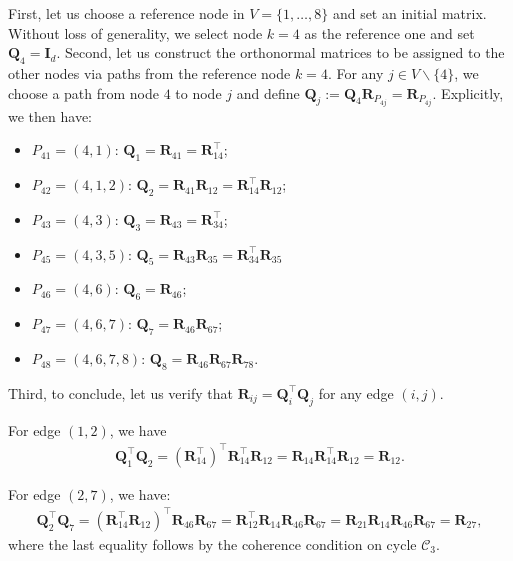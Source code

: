 \documentclass[aps,showpacs,preprintnumbers,amsmath,amssymb,twocolumn,superscriptaddress,floatfix,nofootinbib,10pt,pre]{revtex4-1}
\begin{document}
First, let us choose a reference node in $V=\{1,\dots,8\}$ and set an initial matrix. Without loss of generality, we select node $k=4$ as the reference one and set $\mathbf Q_4=\mathbf I_d$. 
Second, let us construct the orthonormal matrices to be assigned to the other nodes via paths from the reference node $k=4$. For any $j\in V\backslash\{4\}$, we choose a path from node $4$ to node $j$ and define $\mathbf Q_j:=\mathbf Q_4\mathbf R_{P_{4j}}=\mathbf R_{P_{4j}}$. Explicitly, we then have:
\begin{itemize}
    \item $P_{41} = (4, 1)$: $\mathbf{Q}_1 = \mathbf{R}_{41} = \mathbf{R}_{14}^\top$;    
    \item $P_{42} = (4, 1, 2)$: $\mathbf{Q}_2 = \mathbf{R}_{41} \mathbf{R}_{12} 
        = \mathbf{R}_{14}^\top \mathbf{R}_{12}$;
    \item $P_{43} = (4, 3)$: $\mathbf{Q}_3 = \mathbf{R}_{43} = \mathbf{R}_{34}^\top$;
    \item $P_{45} = (4, 3, 5)$: $\mathbf{Q}_5 = \mathbf{R}_{43} \mathbf{R}_{35} 
        = \mathbf{R}_{34}^\top \mathbf{R}_{35}$
    
    \item $P_{46} = (4, 6)$: $\mathbf{Q}_6 = \mathbf{R}_{46}$;
    \item $P_{47} = (4, 6 , 7)$: $\mathbf{Q}_7 = \mathbf{R}_{46} \mathbf{R}_{67}$;
    \item $P_{48} = (4, 6, 7, 8)$: $\mathbf{Q}_8 = \mathbf{R}_{46} \mathbf{R}_{67} \mathbf{R}_{78}$.
\end{itemize}
Third, to conclude, let us verify that $\mathbf R_{ij}=\mathbf Q_i^\top\mathbf Q_j$ for any edge $(i,j)$. 

For edge $(1,2)$, we have
\begin{align}
    \mathbf Q_1^\top\mathbf Q_2 = (\mathbf R_{14}^\top)^\top\mathbf R_{14}^\top\mathbf R_{12} = \mathbf R_{14}\mathbf R_{14}^\top\mathbf R_{12} = \mathbf R_{12}. 
\end{align}

For edge $(2,7)$, we have:
\begin{align}
    \mathbf Q_2^\top\mathbf Q_7 = (\mathbf{R}_{14}^\top \mathbf{R}_{12})^\top\mathbf{R}_{46} \mathbf{R}_{67} = \mathbf{R}_{12}^\top\mathbf{R}_{14}\mathbf{R}_{46} \mathbf{R}_{67} = \mathbf{R}_{21}\mathbf{R}_{14}\mathbf{R}_{46} \mathbf{R}_{67} = \mathbf R_{27}, 
\end{align}
where the last equality follows by the coherence condition on cycle $\mathcal C_3$. 
\end{document}
